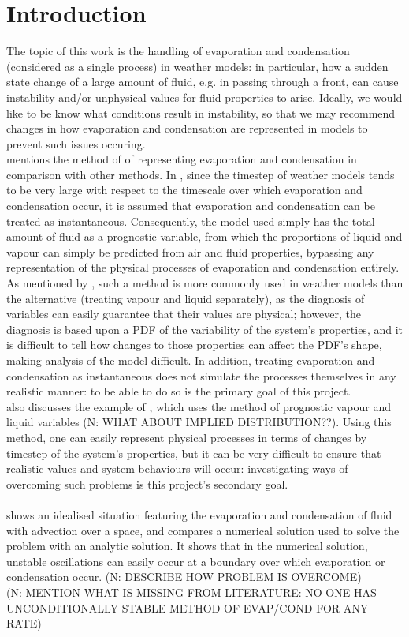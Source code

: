 \documentclass[11pt]{article}
\begin{document}
\section{Introduction}
The topic of this work is the handling of evaporation and condensation (considered as a single process) in weather models: in particular, how a sudden state change of a large amount of fluid, e.g. in passing through a front, can cause instability and/or unphysical values for fluid properties to arise. Ideally, we would like to be know what conditions result in instability, so that we may recommend changes in how evaporation and condensation are represented in models to prevent such issues occuring.
~\\
\citet[p.~2095]{Wilson2008} mentions the method of \citet{Smith1990} of representing evaporation and condensation in comparison with other methods. In \citeauthor{Smith1990}, since the timestep of weather models tends to be very large with respect to the timescale over which evaporation and condensation occur, it is assumed that evaporation and condensation can be treated as instantaneous. Consequently, the model used simply has the total amount of fluid as a prognostic variable, from which the proportions of liquid and vapour can simply be predicted from air and fluid properties, bypassing any representation of the physical processes of evaporation and condensation entirely.
As mentioned by \citeauthor{Wilson2008}, such a method is more commonly used in weather models than the alternative (treating vapour and liquid separately), as the diagnosis of variables can easily guarantee that their values are physical; however, the diagnosis is based upon a PDF of the variability of the system's properties, and it is difficult to tell how changes to those properties can affect the PDF's shape, making analysis of the model difficult. In addition, treating evaporation and condensation as instantaneous does not simulate the processes themselves in any realistic manner: to be able to do so is the primary goal of this project. \\
\citeauthor{Wilson2008} also discusses the example of \citet{Tiedtke1993}, which uses the method of prognostic vapour and liquid variables (N: WHAT ABOUT IMPLIED DISTRIBUTION??). Using this method, one can easily represent physical processes in terms of changes by timestep of the system's properties, but it can be very difficult to ensure that realistic values and system behaviours will occur: investigating ways of overcoming such problems is this project's secondary goal. \\
~\\
\citet{GS1990} shows an idealised situation featuring the evaporation and condensation of fluid with advection over a space, and compares a numerical solution used to solve the problem with an analytic solution. It shows that in the numerical solution, unstable oscillations can easily occur at a boundary over which evaporation or condensation occur. (N: DESCRIBE HOW PROBLEM IS OVERCOME) \\
(N: MENTION WHAT IS MISSING FROM LITERATURE: NO ONE HAS UNCONDITIONALLY STABLE METHOD OF EVAP/COND FOR ANY RATE)
\end{document}
